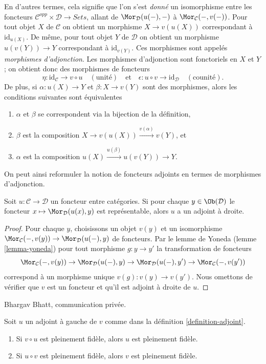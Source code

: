 \noindent
En d'autres termes, cela signifie que l'on s'est {\it donné} un isomorphisme entre
les foncteurs $\mathcal{C}^{opp} \times \mathcal{D} \to \textit{Sets}$, allant de
$\Mor_\mathcal{D}(u(-), -)$ à $\Mor_\mathcal{C}(-, v(-))$. Pour tout objet $X$
de $\mathcal{C}$ on obtient un morphisme $X \to v(u(X))$ correspondant à
$\text{id}_{u(X)}$. De même, pour tout objet $Y$ de $\mathcal{D}$ on obtient
un morphisme $u(v(Y)) \to Y$ correspondant à $\text{id}_{v(Y)}$. Ces
morphismes sont appelés {\it morphismes d'adjonction}. Les morphismes
d'adjonction sont fonctoriels en $X$ et $Y$ ; on obtient donc des morphismes
de foncteurs
$$
\eta : \text{id}_\mathcal{C} \to v \circ u\quad (\text{unité})
\quad\text{et}\quad
\epsilon : u \circ v \to \text{id}_\mathcal{D}\quad (\text{counité}).
$$
De plus, si $\alpha : u(X) \to Y$ et $\beta : X \to v(Y)$ sont des morphismes,
alors les conditions suivantes sont équivalentes
\begin{enumerate}
\item $\alpha$ et $\beta$ se correspondent via la bijection de la définition,
\item $\beta$ est la composition $X \to v(u(X)) \xrightarrow{v(\alpha)} v(Y)$,
et
\item $\alpha$ est la composition $u(X) \xrightarrow{u(\beta)} u(v(Y)) \to Y$.
\end{enumerate}
On peut ainsi reformuler la notion de foncteurs adjoints en termes de
morphismes d'adjonction.

\begin{lemma}
\label{lemma-adjoint-exists}
Soit $u : \mathcal{C} \to \mathcal{D}$ un foncteur entre catégories. Si pour
chaque $y \in \Ob(\mathcal{D})$ le foncteur $x \mapsto \Mor_\mathcal{D}(u(x), y)$ est représentable, alors $u$ a un adjoint à droite.
\end{lemma}

\begin{proof}
Pour chaque $y$, choisissons un objet $v(y)$ et un isomorphisme
$\Mor_\mathcal{C}(-, v(y)) \to \Mor_\mathcal{D}(u(-), y)$ de foncteurs. Par le
lemme de Yoneda (lemme \ref{lemma-yoneda}) pour tout morphisme $g : y \to y'$
la transformation de foncteurs
$$
\Mor_\mathcal{C}(-, v(y)) \to \Mor_\mathcal{D}(u(-), y) \to
\Mor_\mathcal{D}(u(-), y') \to \Mor_\mathcal{C}(-, v(y'))
$$
correspond à un morphisme unique $v(g) : v(y) \to v(y')$. Nous omettons de
vérifier que $v$ est un foncteur et qu'il est adjoint à droite de $u$.
\end{proof}

\begin{lemma}
\label{lemma-left-adjoint-composed-fully-faithful}
\begin{reference}
Bhargav Bhatt, communication privée.
\end{reference}
Soit $u$ un adjoint à gauche de $v$ comme dans la définition
\ref{definition-adjoint}.
\begin{enumerate}
\item Si $v \circ u$ est pleinement fidèle, alors $u$ est pleinement fidèle.
\item Si $u \circ v$ est pleinement fidèle, alors $v$ est pleinement fidèle.
\end{enumerate}
\end{lemma}

